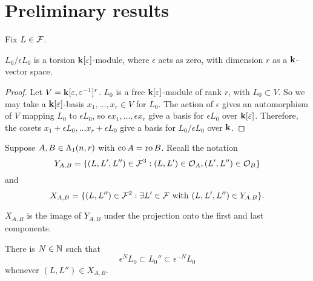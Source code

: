 \documentclass[a4paper, 11pt]{report}
\begin{document}
\section{Preliminary results}

Fix $L\in\mathcal{F}$.

\begin{lemma}
$L_0/{\epsilon L_0}$ is a torsion $\mathbf{k}[\varepsilon]$-module, where $\epsilon$ acts as zero, with dimension $r$ as a $\mathbf{k}$-vector space.
\end{lemma}
\begin{proof}
Let $V = \mathbf{k}[\varepsilon,\varepsilon^{-1}]^r$. $L_0$ is a free $\mathbf{k}[\varepsilon]$-module of rank $r$, with $L_0\subset V$. So we may take a $\mathbf{k}[\varepsilon]$-basis $x_1,\ldots, x_r\in V$ for $L_0$. The action of $\epsilon$ gives an automorphism of $V$ mapping $L_0$ to $\epsilon L_0$, so $\epsilon x_1,\ldots,\epsilon x_r$ give a basis for $\epsilon L_0$ over $\mathbf{k}[\varepsilon]$. Therefore, the cosets $x_1 + \epsilon L_0,\ldots x_r +\epsilon L_0$ give a basis for $L_0/{\epsilon L_0}$ over $\mathbf{k}$.
\end{proof}

Suppose $A,B\in\Lambda_1(n,r)$ with $\operatorname{co}{A}=\operatorname{ro}{B}$. Recall the notation
\begin{equation*}
Y_{A,B} = \{(L,L',L'')\in\mathcal{F}^3: (L,L')\in\mathcal{O}_A, (L',L'')\in\mathcal{O}_B\}
\end{equation*}
and
\begin{equation*}
X_{A,B} = \{(L,L'')\in\mathcal{F}^2:\exists L'\in\mathcal{F} \text{ with } (L,L',L'')\in Y_{A,B}\}.
\end{equation*}

$X_{A,B}$ is the image of $Y_{A,B}$ under the projection onto the first and last components.

\begin{lemma}\label{lemma:orbit-products-are-bounded}
There is $N\in\mathbb{N}$ such that
\begin{equation*}
\epsilon^N L_0\subset L_0''\subset \epsilon^{-N}L_0
\end{equation*}
whenever $(L,L'')\in X_{A,B}$.
\end{lemma}
\end{document}
